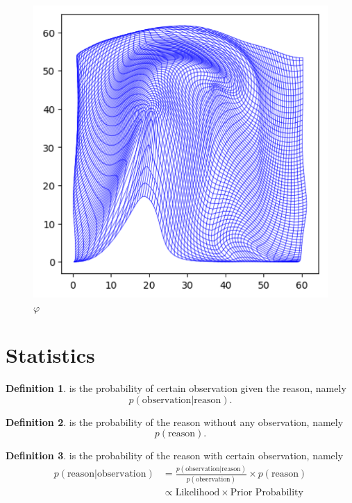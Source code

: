 \documentclass[a4paper]{article}
\theoremstyle{definition}
\newtheorem{definition}{Definition}
\theoremstyle{plain}
\begin{document}
\begin{figure}[H]
\centering
\includegraphics[scale=0.6]{figure/diffeo.png}
\caption{$\varphi$}
\end{figure}

\newpage
\section{Statistics}
\begin{definition}
 is the probability of certain observation given the reason, namely
\begin{equation*}
    p(\text{observation}|\text{reason}).
\end{equation*}
\end{definition}

\begin{definition}
 is the probability of the reason without any observation, namely
\begin{equation*}
    p(\text{reason}).
\end{equation*}
\end{definition}

\begin{definition}
 is the probability of the reason with certain observation, namely
\begin{align*}
    p(\text{reason}|\text{observation})&=\frac{p(\text{observation}|\text{reason})}{p(\text{observation})}\times p(\text{reason})\\
    &\propto \text{Likelihood}\times\text{Prior Probability}
\end{align*}
\end{definition}
\end{document}
